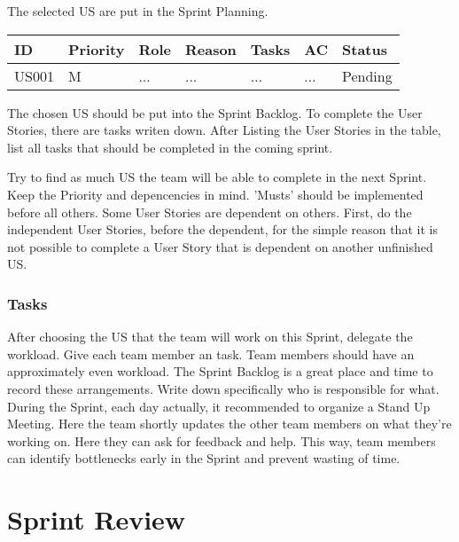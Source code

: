 \documentclass[10pt]{report}
\begin{document}
The selected US are put in the Sprint Planning. 

\medskip
\begin{tabularx}{0.8\textwidth} {
  | >{\raggedright\arraybackslash}X 
  | >{\centering\arraybackslash}X 
  | >{\raggedright\arraybackslash}X 
  | >{\raggedright\arraybackslash}X 
  | >{\raggedright\arraybackslash}X 
  | >{\raggedright\arraybackslash}X 
  | >{\raggedleft\arraybackslash}X | }
 \hline
 ID & Priority & Role & Reason & Tasks & AC & Status \\
 \hline
 US001 & M & ... & ...  & ... & ... & Pending \\
 \hline
\end{tabularx}
\medskip

The chosen US should be put into the Sprint Backlog. To complete the User Stories, there are tasks writen down. After Listing the User Stories in the table, list all tasks that should be completed in the coming sprint. 

Try to find as much US the team will be able to complete in the next Sprint. Keep the Priority and depencencies in mind. 'Musts' should be implemented before all others. Some User Stories are dependent on others. First, do the independent User Stories, before the dependent, for the simple reason that it is not possible to complete a User Story that is dependent on another unfinished US.

\subsubsection{Tasks}

After choosing the US that the team will work on this Sprint, delegate the workload. Give each team member an task. Team members should have an approximately even workload. The Sprint Backlog is a great place and time to record these arrangements. Write down specifically who is responsible for what. During the Sprint, each day actually, it recommended to organize a Stand Up Meeting. Here the team shortly updates the other team members on what they're working on. Here they can ask for feedback and help. This way, team members can identify bottlenecks early in the Sprint and prevent wasting of time.

\newpage

\section{Sprint Review}
\end{document}
